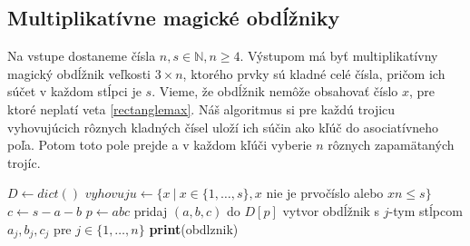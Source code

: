 \subsection{Multiplikatívne magické obdĺžniky}

\begin{alg}
\label{algmmos}
Na vstupe dostaneme čísla $n,s \in \mathbb{N}, n \geq 4$. Výstupom má byť multiplikatívny magický obdĺžnik veľkosti $3 \times n$, ktorého prvky sú kladné celé čísla, pričom ich súčet v každom stĺpci je $s$. Vieme, že obdĺžnik nemôže obsahovať číslo $x$, pre ktoré neplatí veta \ref{rectanglemax}. Náš algoritmus si pre každú trojicu vyhovujúcich rôznych kladných čísel uloží ich súčin ako kľúč do asociatívneho poľa. Potom toto pole prejde a v každom kľúči vyberie $n$ rôznych zapamätaných trojíc.
\end{alg}

\begin{algorithmic}
\STATE $D \gets dict()$
\STATE $vyhovuju \gets \{x ~|~ x \in \{1, \dots , s\}, x$ nie je prvočíslo alebo $xn \leq s\}$
	\STATE $c \gets s-a-b$
		\STATE $p \gets abc$
		\STATE pridaj $(a,b,c)$ do $D[p]$
	\ENDIF
\ENDFOR
{}
				\STATE vytvor obdĺžnik s $j$-tym stĺpcom $a_{j}, b_{j}, c_{j}$ pre $j \in \{1, \dots , n\}$
					\STATE \textbf{print}(obdlznik)
				\ENDIF
			\ENDFOR
		\ENDIF
	\ENDFOR
\ENDFOR
\end{algorithmic}



